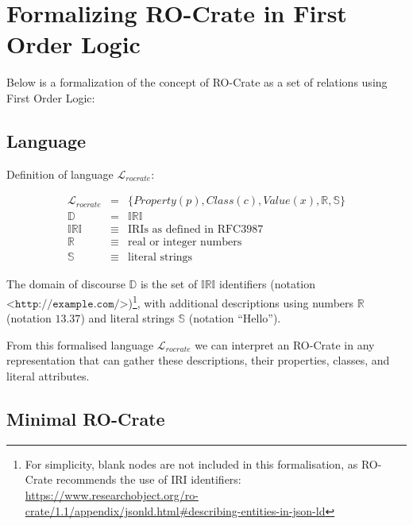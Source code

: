 %


\section{Formalizing RO-Crate in First Order Logic}

\label{sec:formaldefinition}

Below is a formalization of the concept of RO-Crate as a set of relations using First Order Logic:

\subsection{Language}

Definition of language $\mathcal{L}_{rocrate}$:

\begin{eqnarray*}
    \mathcal{L}_{rocrate}   & = & \big\{ Property(p), Class(c),
                            Value(x), \mathbb{R}, \mathbb{S} \big\} \\
    \mathbb{D}              & = & \mathbb{IRI} \\
    \mathbb{IRI}            & \equiv & { \text{IRIs as defined in RFC3987} } \\
    \mathbb{R}              & \equiv & { \text{real or integer numbers} } \\
    \mathbb{S}              & \equiv & { \text{literal strings} }
\end{eqnarray*}


The domain of discourse $\mathbb{D}$ is the set of $\mathbb{IRI}$ identifiers \cite{doi:10.17487/rfc3987} (notation $\texttt{<http://example.com/>}$)\footnote{
    For simplicity, blank nodes are not included in this formalisation, as RO-Crate
    recommends the use of IRI identifiers: \url{https://www.researchobject.org/ro-crate/1.1/appendix/jsonld.html\#describing-entities-in-json-ld}
}, with additional descriptions using numbers $\mathbb{R}$ (notation $13.37$) and literal strings $\mathbb{S}$ (notation $\text{“Hello”}$).

From this formalised language $\mathcal{L}_{rocrate}$ we can interpret an RO-Crate in any representation that can gather these descriptions, their properties, classes, and literal attributes.

\subsection{Minimal RO-Crate}

